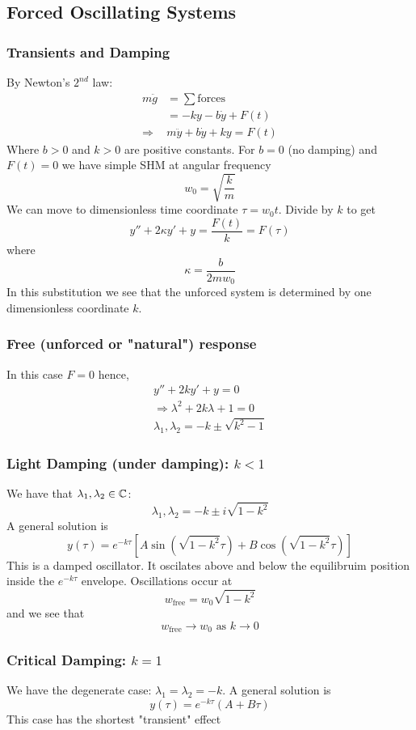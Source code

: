 \documentclass{article}
\begin{document}
\subsection{Forced Oscillating Systems}
\subsubsection*{Transients and Damping}
By Newton's $2^{nd}$ law:
\begin{align*}
    m \ddot{g} &= \sum {\text{forces}} \\
    &= -k y - b\dot{y} + F(t) \\
    \Rightarrow& m \ddot{y} + b \dot{y} + k y = F(t)
\end{align*}
Where $b > 0$ and $k > 0$ are positive constants.
For $b = 0$ (no damping) and $F(t) = 0$ we have simple SHM at angular frequency
\[
    w_0 = \sqrt{\frac{k}{m}}
\]
We can move to dimensionless time coordinate $\tau = w_0 t$. Divide by $k$ to get
\[
    y'' + 2\kappa y' + y = \frac{F(t)}{k} = F(\tau)  
\]
where
\[
    \kappa = \frac{b}{2mw_0}    
\]
In this substitution we see that the unforced system is determined by one dimensionless coordinate $k$.
\subsubsection{Free (unforced or "natural") response}
In this case $F = 0$ hence,
\begin{align*}
    y'' + 2k y' + y = 0 \\
    \Rightarrow \lambda^2 + 2k \lambda + 1 = 0 \tag{characteristic equation}\\
    \lambda_1, \lambda_2 = -k \pm \sqrt{k^2 - 1}
\end{align*}

\subsubsection*{Light Damping (under damping): $k < 1$}
We have that $\lambda_1, \lambda_2 \in \mathbb{C}$:
\[
    \lambda_1, \lambda_2 = -k \pm i \sqrt{1 - k^2}
\]
A general solution is
\[
    y(\tau) = e^{-k \tau} [A \sin(\sqrt{1 - k^2} \tau) + B \cos (\sqrt{1 - k^2} \tau)]
\]
This is a damped oscillator. It oscilates above and below the equilibruim position inside the $e^{-k\tau}$ envelope.
Oscillations occur at 
\[
    w_{\text{free}} = w_0 \sqrt{1 - k^2}
\]
and we see that
\[
    w_{\text{free}} \rightarrow w_0 \text{ as } k \rightarrow 0
\]
\subsubsection*{Critical Damping: $k = 1$}
We have the degenerate case: $\lambda_1 = \lambda_2 = -k$.
A general solution is
\[
    y(\tau) = e^{-k \tau}(A + B \tau)  
\]
This case has the shortest "transient" effect
\end{document}
